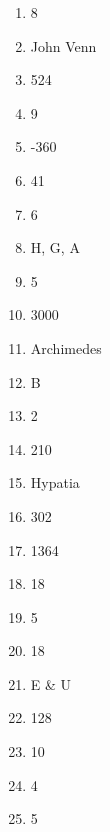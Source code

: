 \documentclass[../uilmath.tex]{subfiles}
\begin{document}
\begin{enumerate}[label=\bfseries\arabic*.]
    \item %
    8

    \item %
    John Venn 

    \item %
    524

    \item %
    9

    \item %
    -360

    \item %
    41

    \item %
    6

    \item %
    H, G, A 

    \item %
    5

    \item %
    3000

    \item %
    Archimedes

    \item %
    B 

    \item %
    2

    \item %
    210

    \item %
    Hypatia 

    \item %
    302

    \item %
    1364

    \item %
    18

    \item %
    5

    \item %
    18

    \item %
    E \& U 

    \item %
    128

    \item %
    10

    \item %
    4

    \item %
    5    
\end{enumerate}
\end{document}
